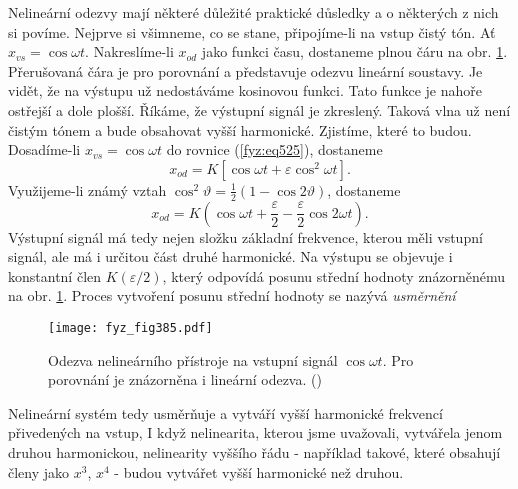   Nelineární odezvy mají některé důležité praktické důsledky a o některých z nich si povíme. 
  Nejprve si všimneme, co se stane, připojíme-li na vstup čistý tón. Ať \(x_{vs} = \cos\omega t\). 
  Nakreslíme-li \(x_{od}\) jako funkci času, dostaneme plnou čáru na obr. \ref{fyz:fig385}. 
  Přerušovaná čára je pro porovnání a představuje odezvu lineární soustavy. Je vidět, že na výstupu 
  už nedostáváme kosinovou funkci. Tato funkce je nahoře ostřejší a dole plošší. Říkáme, že 
  výstupní signál je zkreslený. Taková vlna už není čistým tónem a bude obsahovat vyšší harmonické. 
  Zjistíme, které to budou. Dosadíme-li \(x_{vs} = \cos\omega t\) do rovnice (\ref{fyz:eq525}), 
  dostaneme
  \begin{equation}\label{fyz:eq524}
    x_{od} = K[\cos\omega t + \varepsilon\cos^2\omega t ]. 
  \end{equation}
  Využijeme-li známý vztah \(\cos^2\vartheta = \frac{1}{2}(1 - \cos2\vartheta)\), dostaneme 
  \begin{equation}\label{fyz:eq526}
    x_{od} = K\left(\cos\omega t+\frac{\varepsilon}{2}-\frac{\varepsilon}{2}\cos2\omega t\right). 
  \end{equation}
  Výstupní signál má tedy nejen složku základní frekvence, kterou měli vstupní signál, ale má i 
  určitou část druhé harmonické. Na výstupu se objevuje i konstantní člen \(K(\varepsilon/2)\), 
  který odpovídá posunu střední hodnoty znázorněnému na obr. \ref{fyz:fig385}. Proces vytvoření 
  posunu střední hodnoty se nazývá \emph{usměrnění}
  
  \begin{figure}[ht!] %
    \centering
    \texttt{[image: fyz\_fig385.pdf]}
    \caption{Odezva nelineárního přístroje na vstupní signál \(\cos\omega t\). Pro porovnání je 
             znázorněna i lineární odezva.
             (\cite[s.~682]{Feynman01})}
    \label{fyz:fig385}
  \end{figure}
  
  Nelineární systém tedy usměrňuje a vytváří vyšší harmonické frekvencí přivedených na vstup, I 
  když nelinearita, kterou jsme uvažovali, vytvářela jenom druhou harmonickou, nelinearity vyššího 
  řádu - například takové, které obsahují členy jako \(x^3\), \(x^4\) - budou vytvářet vyšší 
  harmonické než druhou.
  
